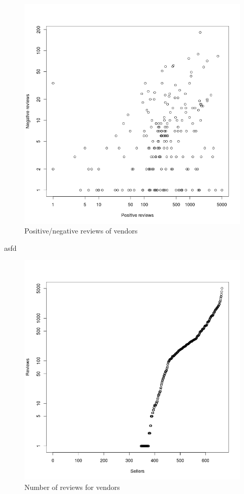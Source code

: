 \documentclass[
  digital, %
  table,   %
  lof,     %
  lot,     %
  oneside
]{fithesis3}
\begin{document}
\begin{figure}[!htb]
    \centering
    \includegraphics[scale=0.4]{posneg-log}
    \caption{Positive/negative reviews of vendors}
    \label{posneg}
\end{figure}
asfd
\begin{figure}[!htb]
    \centering
    \includegraphics[scale=0.4]{reviews-count-log}
    \caption{Number of reviews for vendors}
    \label{reviews}
\end{figure}
\end{document}
